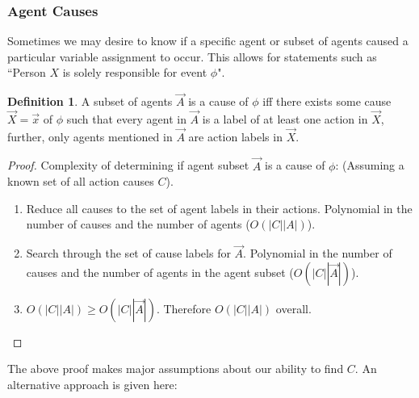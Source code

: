 \documentclass{article}
\theoremstyle{plain}
\theoremstyle{definition}
\newtheorem{defn}[thm]{Definition} %
\begin{document}
\subsubsection*{Agent Causes}
Sometimes we may desire to know if a specific agent or subset of agents caused a particular variable assignment to occur. This allows for statements such as ``Person $X$ is solely responsible for event $\phi$".
\begin{defn}
A subset of agents $\vec{A}$ is a cause of $\phi$ iff there exists some cause $\vec{X}=\vec{x}$ of $\phi$ such that every agent in $\vec{A}$ is a label of at least one action in $\vec{X}$, further, only agents mentioned in $\vec{A}$ are action labels in $\vec{X}$.
\end{defn}

\begin{proof}
Complexity of determining if agent subset $\vec{A}$ is a cause of $\phi$: (Assuming a known set of all action causes $C$). 

\begin{enumerate}
\item Reduce all causes to the set of agent labels in their actions. Polynomial in the number of causes and the number of agents ($O(|C||A|)$).
\item Search through the set of cause labels for $\vec{A}$. Polynomial in the number of causes and the number of agents in the agent subset ($O(|C||\vec{A}|)$).
\item $O(|C||A|) \geq O(|C||\vec{A}|)$. Therefore $O(|C||A|)$ overall.
\end{enumerate}
\end{proof}

The above proof makes major assumptions about our ability to find $C$. An alternative approach is given here:
\end{document}
